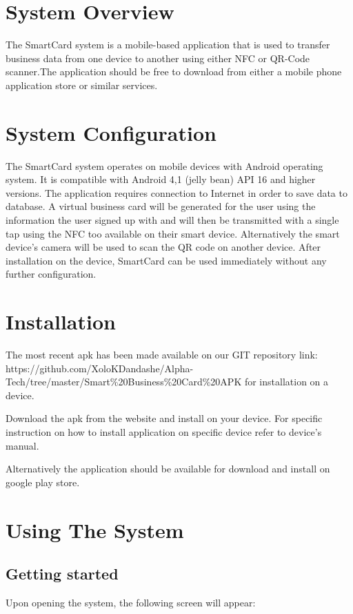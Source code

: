 \documentclass[english]{article}
\begin{document}
	\section{System Overview}
	The SmartCard system is a mobile-based application that is used to transfer business data from one device to another using either NFC or QR-Code scanner.The application should be free to download from either a mobile phone application store or similar services. 
	
	\section{System Configuration}
	The SmartCard system operates on mobile devices with Android operating system. It is compatible with
	Android 4,1 (jelly bean) API 16 and higher versions. The application requires connection to Internet in order to
	save data to database. A virtual business card will be generated for the user using the information the user signed up with and will then be transmitted with a single tap using the NFC too available on their smart device. Alternatively the smart device’s camera will be used to scan the QR code on another device. After
	installation on the device, SmartCard can be used immediately without any further configuration.
	\section{Installation}
	The most recent apk has been made available on our GIT repository link: https://github.com/XoloKDandashe/Alpha-Tech/tree/master/Smart\%20Business\%20Card\%20APK for installation on a device. 
	
	Download the apk from the website and install on your device. For specific instruction on how to install application on specific device refer to
	device’s manual.
	
	Alternatively the application should be available for download and install on google play store.
	

	\section {Using The System}
	\subsection{Getting started}
	Upon opening the system, the following screen will appear:
	
\end{document}

